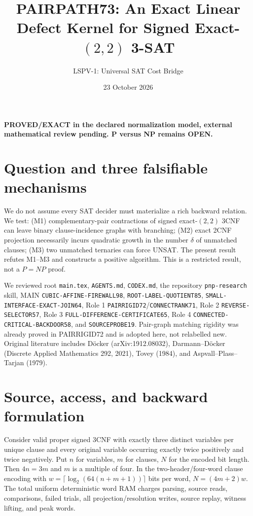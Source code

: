 \documentclass[11pt]{article}
\title{PAIRPATH73: An Exact Linear Defect Kernel for Signed Exact-$(2,2)$ 3-SAT}
\author{LSPV-1: Universal SAT Cost Bridge}
\date{23 October 2026}
\begin{document}
\maketitle
\begin{center}\textbf{PROVED/EXACT in the declared normalization model, external mathematical review pending. P versus NP remains OPEN.}\end{center}

\section{Question and three falsifiable mechanisms}
We do not assume every SAT decider must materialize a rich backward relation. We test: (M1) complementary-pair contractions of signed exact-$(2,2)$ 3CNF can leave binary clause-incidence graphs with branching; (M2) exact 2CNF projection necessarily incurs quadratic growth in the number $\delta$ of unmatched clauses; (M3) two unmatched ternaries can force UNSAT. The present result refutes M1--M3 and constructs a positive algorithm. This is a restricted result, not a $P=NP$ proof.

We reviewed root \texttt{main.tex}, \texttt{AGENTS.md}, \texttt{CODEX.md}, the repository \texttt{pnp-research} skill, MAIN \texttt{CUBIC-AFFINE-FIREWALL98}, \texttt{ROOT-LABEL-QUOTIENT85}, \texttt{SMALL-INTERFACE-EXACT-JOIN64}, Role 1 \texttt{PAIRRIGID72}/\texttt{CONNECTRANK71}, Role 2 \texttt{REVERSE-SELECTOR57}, Role 3 \texttt{FULL-DIFFERENCE-CERTIFICATE65}, Role 4 \texttt{CONNECTED-CRITICAL-BACKDOOR58}, and \texttt{SOURCEPROBE19}. Pair-graph matching rigidity was already proved in PAIRRIGID72 and is adopted here, not relabelled new. Original literature includes D\"ocker (arXiv:1912.08032), Darmann--D\"ocker (Discrete Applied Mathematics 292, 2021), Tovey (1984), and Aspvall--Plass--Tarjan (1979).

\section{Source, access, and backward formulation}
Consider valid proper signed 3CNF with exactly three distinct variables per unique clause and every original variable occurring exactly twice positively and twice negatively. Put $n$ for variables, $m$ for clauses, $N$ for the encoded bit length. Then $4n=3m$ and $m$ is a multiple of four. In the two-header/four-word clause encoding with $w=\lceil\log_2(64(n+m+1))\rceil$ bits per word, $N=(4m+2)w$. The total uniform deterministic word RAM charges parsing, source reads, comparisons, failed trials, all projection/resolution writes, source replay, witness lifting, and peak words.
\end{document}
